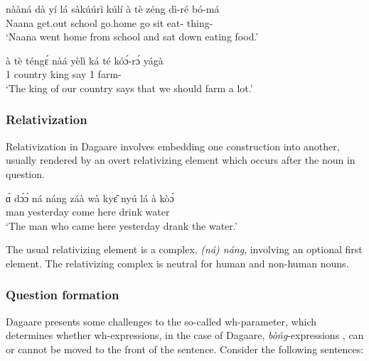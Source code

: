 \ea \label{ex:conj1} \gll nààná dà yí lá sàkúúrì kúlí à tè zéng dì-ré bó-má\\
Naana {\PST} get.out {\FOC} school go.home {\CONJ} go sit eat-{\IMPF} thing-{\PL}\\
\glt ‘Naana went home from school and sat down eating food.’\z


\ea \label{ex:conj2} \gll à tè téngɛ́ nàá yèlì ká té kóɔ́-rɔ́ yágà\\
{\DEF} 1{\PL} country king say {\CONJ} 1{\PL} farm-{\IMPF} {\INTENS}\\
\glt ‘The king of our country says that we should farm a lot.’\z 

\subsubsection{ Relativization}
Relativization in Dagaare involves embedding one construction into another, usually
rendered by an overt relativizing element which occurs after the noun in question.

\ea \gll ɑ̀ dɔ́ɔ́ ná náng záà wà kyɛ̂ nyú lá à kòɔ́\\
{\DEF} man {\REL} {\REL} yesterday come here drink {\FOC} {\DEF} water\\
\glt ‘The man who came here yesterday drank the water.’\z 

The usual relativizing element is a complex, \textit{(ná) náng}, involving an optional first element.
The relativizing complex is neutral for human and non-human nouns.

\subsubsection{Question formation}
Dagaare presents some challenges to the so-called wh-parameter, which determines
whether wh-expressions, in the case of Dagaare, \textit{bòńg}-expressions \citep{Bodomo1997}, can or
cannot be moved to the front of the sentence. Consider the following sentences:


\ea {}
\z\z

